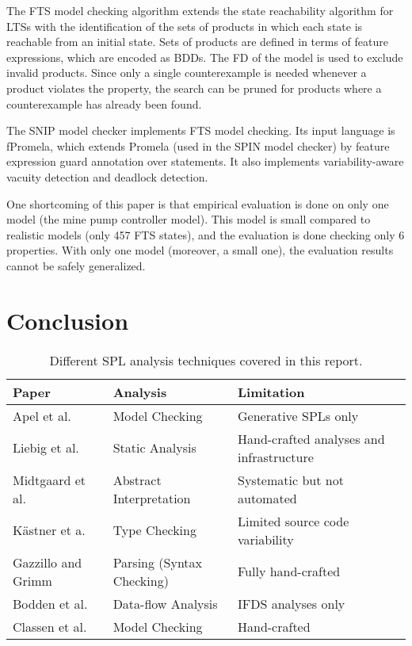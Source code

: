 \documentclass[11pt]{article}
\begin{document}
The FTS model checking algorithm extends the state reachability algorithm for LTSs with the identification of the sets of products in which each state is reachable from an initial state. Sets of products are defined in terms of feature expressions, which are encoded as BDDs. The FD of the model is used to exclude invalid products. Since only a single counterexample is needed whenever a product violates the property, the search can be pruned for products where a counterexample has already been found.

The SNIP model checker implements FTS model checking. Its input language is fPromela, which extends Promela (used in the SPIN model checker) by feature expression guard annotation over statements. It also implements variability-aware vacuity detection and deadlock detection.

One shortcoming of this paper is that empirical evaluation is done on only one model (the mine pump controller model). This model is small compared to realistic models (only 457 FTS states), and the evaluation is done checking only 6 properties. With only one model (moreover, a small one), the evaluation results cannot be safely generalized. 

\section{Conclusion}

\begin{table}[h!]
\begin{tabular}{ |l|l|l|l|}
\hline
Paper & Analysis & Limitation \\
\hline
Apel et al.~\cite{Apel:2013} & Model Checking & Generative SPLs only  \\
Liebig et al.~\cite{Liebig:2013} & Static Analysis & Hand-crafted analyses and infrastructure  \\
Midtgaard et al.~\cite{Midtgaard:2015} & Abstract Interpretation & Systematic but not automated \\
K\"{a}stner et a.~\cite{Kastner:2012} & Type Checking & Limited source code variability \\
Gazzillo and Grimm~\cite{Gazzillo:2012} & Parsing (Syntax Checking) & Fully hand-crafted \\
Bodden et al.~\cite{Bodden:2013} & Data-flow Analysis & IFDS analyses only \\
Classen et al.~\cite{Classen:2013} & Model Checking & Hand-crafted \\
\hline
\end{tabular}
\caption{Different SPL analysis techniques covered in this report.}
\label{tbl1}
\end{table}
\end{document}
